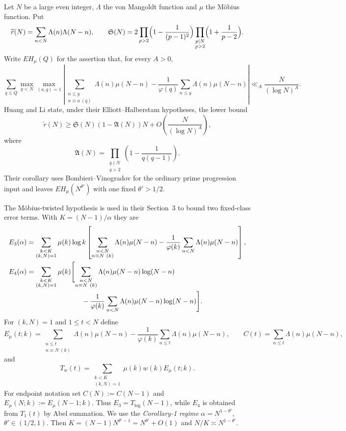 \documentclass[11pt,a4paper]{article}
\theoremstyle{plain}
\theoremstyle{definition}
\theoremstyle{remark}
\renewcommand{\SS}{\mathfrak{S}}
\newcommand{\AAA}{\mathfrak{A}}
\newcommand{\Emu}{E_\mu}
\begin{document}
Let $N$ be a large even integer, $\Lambda$ the von Mangoldt function and
$\mu$ the M\"obius function.  Put
\[
  \widetilde r(N)=\sum_{n<N}\Lambda(n)\Lambda(N-n),\qquad
  \SS(N)=2\prod_{p>2}\Bigl(1-\frac1{(p-1)^2}\Bigr)
  \prod_{\substack{p\mid N\\p>2}}\Bigl(1+\frac1{p-2}\Bigr).
\]
Write $EH_\mu(Q)$ for the assertion that, for every $A>0$,
\begin{equation}\label{eq:EHmu}
  \sum_{q\le Q}\max_{y<N}\max_{(a,q)=1}
  \left|\sum_{\substack{n\le y\\n\equiv a\ (q)}}
  \Lambda(n)\mu(N-n)-\frac1{\varphi(q)}
  \sum_{n\le y}\Lambda(n)\mu(N-n)\right|
  \ll_A \frac{N}{(\log N)^A}.
\end{equation}
Huang and Li \cite{HL} state, under their Elliott--Halberstam
hypotheses, the lower bound
\begin{equation}\label{eq:HLthm1}
  \widetilde r(N)\ge \SS(N)(1-\AAA(N))N
  +O\!\left(\frac{N}{(\log N)^A}\right),
\end{equation}
where
\begin{equation}\label{eq:AN}
  \AAA(N)=\prod_{\substack{q\nmid N\\q>2}}
  \left(1-\frac1{q(q-1)}\right).
\end{equation}
Their corollary uses Bombieri--Vinogradov for the ordinary prime
progression input and leaves $EH_\mu(N^{\theta'})$ with one fixed
$\theta'>1/2$.

The M\"obius-twisted hypothesis is used in their Section~3 to bound two
fixed-class error terms.  With $K=(N-1)/\alpha$ they are
\begin{align}
 E_3(\alpha)&=\sum_{\substack{k<K\\(k,N)=1}}\mu(k)\log k
 \left[\sum_{\substack{n<N\\n\equiv N\ (k)}}\Lambda(n)\mu(N-n)
 -\frac1{\varphi(k)}\sum_{n<N}\Lambda(n)\mu(N-n)\right],
 \label{eq:E3}\\
 E_4(\alpha)&=\sum_{\substack{k<K\\(k,N)=1}}\mu(k)
 \Biggl[\sum_{\substack{n<N\\n\equiv N\ (k)}}
 \Lambda(n)\mu(N-n)\log(N-n)\notag\\
 &\hspace{8em}-\frac1{\varphi(k)}\sum_{n<N}
 \Lambda(n)\mu(N-n)\log(N-n)\Biggr].
 \label{eq:E4}
\end{align}
For $(k,N)=1$ and $1\le t<N$ define
\begin{equation}\label{eq:Emu}
 \Emu(t;k)=\sum_{\substack{n\le t\\n\equiv N\ (k)}}
 \Lambda(n)\mu(N-n)-\frac1{\varphi(k)}\sum_{n\le t}
 \Lambda(n)\mu(N-n),\qquad
 C(t)=\sum_{n\le t}\Lambda(n)\mu(N-n),
\end{equation}
and
\[
 T_w(t)=\sum_{\substack{k<K\\(k,N)=1}}\mu(k)w(k)\Emu(t;k).
\]
For endpoint notation set $C(N):=C(N-1)$ and
$\Emu(N;k):=\Emu(N-1;k)$. Thus $E_3=T_{\log}(N-1)$, while $E_4$ is obtained from $T_1(t)$ by
Abel summation.  We use the \emph{Corollary-1 regime}
$\alpha=N^{1-\theta'}$, $\theta'\in(1/2,1)$.  Then
$K=(N-1)N^{\theta'-1}=N^{\theta'}+O(1)$ and
$N/K\asymp N^{1-\theta'}$.
\end{document}
